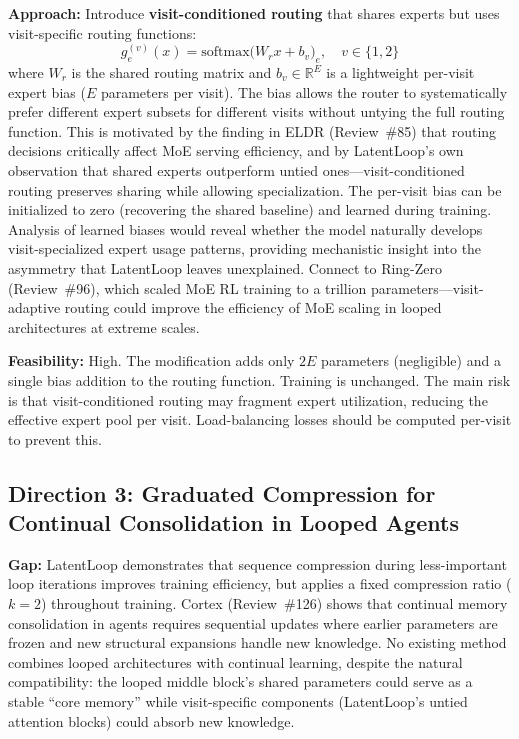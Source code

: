 \documentclass[11pt,a4paper]{article}
\begin{document}
\textbf{Approach:} Introduce \textbf{visit-conditioned routing} that shares experts but uses visit-specific routing functions:
\[
g_e^{(v)}(x) = \mathrm{softmax}\bigl(W_r x + b_v\bigr)_e, \quad v \in \{1, 2\}
\]
where $W_r$ is the shared routing matrix and $b_v \in \mathbb{R}^E$ is a lightweight per-visit expert bias ($E$ parameters per visit). The bias allows the router to systematically prefer different expert subsets for different visits without untying the full routing function. This is motivated by the finding in ELDR (Review~\#85) that routing decisions critically affect MoE serving efficiency, and by LatentLoop's own observation that shared experts outperform untied ones---visit-conditioned routing preserves sharing while allowing specialization. The per-visit bias can be initialized to zero (recovering the shared baseline) and learned during training. Analysis of learned biases would reveal whether the model naturally develops visit-specialized expert usage patterns, providing mechanistic insight into the asymmetry that LatentLoop leaves unexplained. Connect to Ring-Zero (Review~\#96), which scaled MoE RL training to a trillion parameters---visit-adaptive routing could improve the efficiency of MoE scaling in looped architectures at extreme scales.

\textbf{Feasibility:} High. The modification adds only $2E$ parameters (negligible) and a single bias addition to the routing function. Training is unchanged. The main risk is that visit-conditioned routing may fragment expert utilization, reducing the effective expert pool per visit. Load-balancing losses should be computed per-visit to prevent this.

\subsection{Direction 3: Graduated Compression for Continual Consolidation in Looped Agents}
\textbf{Gap:} LatentLoop demonstrates that sequence compression during less-important loop iterations improves training efficiency, but applies a fixed compression ratio ($k{=}2$) throughout training. Cortex (Review~\#126) shows that continual memory consolidation in agents requires sequential updates where earlier parameters are frozen and new structural expansions handle new knowledge. No existing method combines looped architectures with continual learning, despite the natural compatibility: the looped middle block's shared parameters could serve as a stable ``core memory'' while visit-specific components (LatentLoop's untied attention blocks) could absorb new knowledge.
\end{document}
